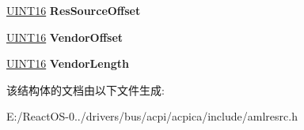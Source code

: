 \begin{DoxyCompactItemize}
\item 
\mbox{\label{structaml__resource__pin__function_a2b1586cc47dfa89a8da8b7e4dbe3f946}} 
\hyperlink{_processor_bind_8h_a09f1a1fb2293e33483cc8d44aefb1eb1}{U\+I\+N\+T16} {\bfseries Res\+Source\+Offset}
\item 
\mbox{\label{structaml__resource__pin__function_ac73f7baa9e62cd5923752e831685115a}} 
\hyperlink{_processor_bind_8h_a09f1a1fb2293e33483cc8d44aefb1eb1}{U\+I\+N\+T16} {\bfseries Vendor\+Offset}
\item 
\mbox{\label{structaml__resource__pin__function_aeb6bafcd2c60b1e4082b73d5e6c80d7e}} 
\hyperlink{_processor_bind_8h_a09f1a1fb2293e33483cc8d44aefb1eb1}{U\+I\+N\+T16} {\bfseries Vendor\+Length}
\end{DoxyCompactItemize}


该结构体的文档由以下文件生成\+:\begin{DoxyCompactItemize}
\item 
E\+:/\+React\+O\+S-\/0../drivers/bus/acpi/acpica/include/amlresrc.\+h\end{DoxyCompactItemize}
